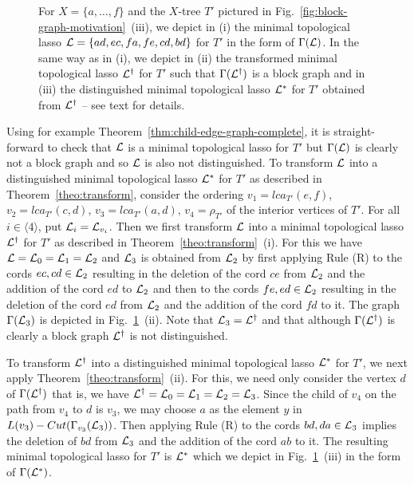 \begin{figure}[h]
  \begin{center}
    
  \end{center}
  \caption{ For $X=\{a,\ldots, f\}$ and the $X$-tree $T'$ pictured in
    Fig.~\ref{fig:block-graph-motivation}~(iii), we depict in (i) the minimal
    topological lasso ${\mathcal L}=\{ad,ec,fa,fe,cd,bd\}$ for $T'$ in the form of
    $\Gamma({\mathcal L})$.  In the same way as in (i), we depict in (ii) the
    transformed minimal topological lasso ${\mathcal L}^{\dagger}$ for $T'$ such that
    $\Gamma({\mathcal L}^{\dagger})$ is a block graph and in (iii) the distinguished
    minimal topological lasso ${\mathcal L}^*$ for $T'$ obtained from ${\mathcal L}^{\dagger}$
    -- see text for details.}
  \label{fig:transformation}
\end{figure}
%
Using for example Theorem~\ref{thm:child-edge-graph-complete}, it is
straight-forward to check that ${\mathcal L}$ is a minimal topological lasso for $T'$
but $\Gamma({\mathcal L})$ is clearly not a block graph and so ${\mathcal L}$ is also not
distinguished. To transform ${\mathcal L}$ into a distinguished minimal topological
lasso ${\mathcal L}^*$ for $T'$ as described in Theorem~\ref{theo:transform}, consider
the ordering $v_1=lca_{T'}(e,f)$, $v_2=lca_{T'}(c,d)$, $v_3=lca_{T'}(a,d)$,
$v_4=\rho_{T'}$ of the interior vertices of $T'$. For all $i\in\langle
4\rangle$, put ${\mathcal L}_i={\mathcal L}_{v_i}$. Then we first transform ${\mathcal L}$ into a minimal
topological lasso ${\mathcal L}^{\dagger}$ for $T'$ as described in
Theorem~\ref{theo:transform}~(i). For this we have ${\mathcal L}={\mathcal L}_0={\mathcal L}_1={\mathcal L}_2$ and
${\mathcal L}_3$ is obtained from ${\mathcal L}_2$ by first applying Rule (R) to the cords $ec,
cd \in {\mathcal L}_2$ resulting in the deletion of the cord $ce$ from ${\mathcal L}_2 $ and the
addition of the cord $ed$ to ${\mathcal L}_2$ and then to the cords $fe,ed\in{\mathcal L}_2$
resulting in the deletion of the cord $ed$ from ${\mathcal L}_2$ and the addition of
the cord $fd$ to it. The graph $\Gamma({\mathcal L}_3)$ is depicted in
Fig.~\ref{fig:transformation}~(ii).  Note that ${\mathcal L}_3={\mathcal L}^{\dagger}$ and that
although $\Gamma({\mathcal L}^{\dagger})$ is clearly a block graph ${\mathcal L}^{\dagger}$ is
not distinguished.

To transform ${\mathcal L}^{\dagger}$ into a distinguished minimal topological lasso
${\mathcal L}^*$ for $T'$, we next apply Theorem~\ref{theo:transform}~(ii). For this, we
need only consider the vertex $d$ of $\Gamma({\mathcal L}^{\dagger})$ that is, we have
${\mathcal L}^{\dagger}={\mathcal L}_0={\mathcal L}_1={\mathcal L}_2={\mathcal L}_3$.  Since the child of $v_4$ on the path
from $v_4$ to $d$ is $v_3$, we may choose $a$ as the element $y$ in
$L(v_3)-Cut(\Gamma_{v_3}({\mathcal L}_3))$. Then applying Rule (R) to the cords
$bd,da\in {\mathcal L}_3$ implies the deletion of $bd$ from ${\mathcal L}_3$ and the addition of
the cord $ab$ to it. The resulting minimal topological lasso for $T'$ is
${\mathcal L}^*$ which we depict in Fig.~\ref{fig:transformation}~(iii) in the form of
$\Gamma({\mathcal L}^*)$.
 

